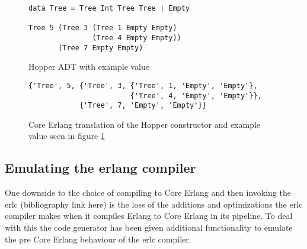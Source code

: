 \begin{figure}[!htb]
\centering
\begin{lstlisting} 
data Tree = Tree Int Tree Tree | Empty

Tree 5 (Tree 3 (Tree 1 Empty Empty) 
               (Tree 4 Empty Empty)) 
       (Tree 7 Empty Empty)
\end{lstlisting}
\caption{Hopper ADT with example value}
\label{lst:hopperAdt}
\end{figure}

\begin{figure}[!htb]
\centering
\begin{lstlisting} 
{'Tree', 5, {'Tree', 3, {'Tree', 1, 'Empty', 'Empty'},
                        {'Tree', 4, 'Empty', 'Empty'}},
            {'Tree', 7, 'Empty', 'Empty'}}
\end{lstlisting}
\caption[Core Erlang translation of constructor and example value]
 {Core Erlang translation of the Hopper constructor and example value seen in figure \ref{lst:hopperAdt}}
\label{lst:coreAdt}
\end{figure}


\subsection{Emulating the erlang compiler}

One downside to the choice of compiling to Core Erlang and then invoking the erlc
(bibliography link here) is the loss of the additions and optimizations the erlc
compiler makes when it compiles Erlang to Core Erlang in its pipeline. To deal with this
the code generator has been given additional functionality to emulate the pre Core Erlang
behaviour of the erlc compiler. 